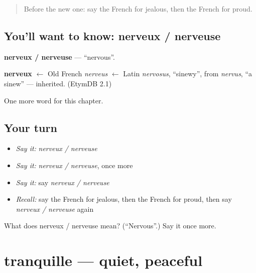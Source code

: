 \label{lesson:FR-C218-nerveux-nerveuse}



\begin{quote}
Before the new one: say the French for jealous, then the French for proud.
\end{quote}

\subsection*{You'll want to know: nerveux / nerveuse}
\textbf{nerveux / nerveuse} — \textquotedblleft{}nervous\textquotedblright{}.

\begin{cousinweb}
\textbf{nerveux} $\leftarrow$ Old French \emph{nerveus} $\leftarrow$ Latin \emph{nervosus}, \textquotedblleft{}sinewy\textquotedblright{}, from \emph{nervus}, \textquotedblleft{}a sinew\textquotedblright{} — inherited. (EtymDB 2.1)
\end{cousinweb}

\begin{grammarlens}[title={What you've built}]
One more word for this chapter.
\end{grammarlens}

\subsection*{Your turn}
\begin{itemize}
\raggedright
  \item \emph{Say it:} \emph{nerveux / nerveuse}
  \item \emph{Say it:} \emph{nerveux / nerveuse}, once more
  \item \emph{Say it:} say \emph{nerveux / nerveuse}
  \item \emph{Recall:} say the French for jealous, then the French for proud, then say \emph{nerveux / nerveuse} again
\end{itemize}

\begin{tcolorbox}[breakable,colback=teal!4,colframe=teal!35!black,title={Before you move on}]
What does nerveux / nerveuse mean? (\textquotedblleft{}Nervous\textquotedblright{}.) Say it once more.
\end{tcolorbox}
\section[tranquille]{tranquille — quiet, peaceful}

